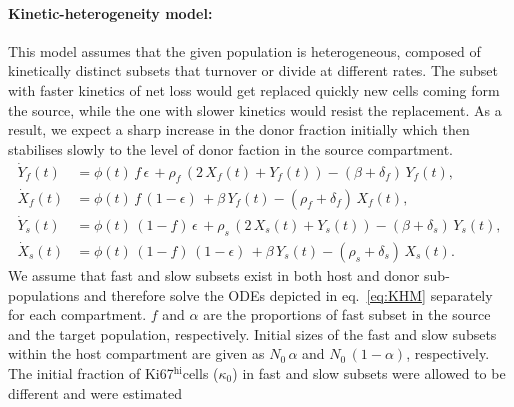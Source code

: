 \documentclass[11pt]{article}
\newcommand{\be}{\begin{equation}}
\newcommand{\ee}{\end{equation}}
\newcommand{\khi}{Ki67$^\text{hi}$}
\begin{document}
\paragraph{Kinetic-heterogeneity model:}
This model assumes that the given population is heterogeneous, composed of kinetically distinct subsets that turnover or divide at different rates. 
The subset with faster kinetics of net loss  would get replaced quickly new cells coming form the source, while the one with slower kinetics would resist the replacement.
As a result, we expect a sharp increase in the donor fraction initially which then stabilises slowly to the level of donor faction in the source compartment.
\be
\begin{aligned}
\dot Y_f(t) &= \phi(t) \, f \, \epsilon \, + \rho_f \,(2 \, X_f(t) + Y_f(t)) - (\beta + \delta_f) \, Y_f(t),\\
\dot X_f(t) &= \phi(t) \, f \, (1-\epsilon) \, + \beta  \, Y_f(t) - (\rho_f + \delta_f) \, X_f(t), \\
\dot Y_s(t) &= \phi(t) \, (1-f) \, \epsilon \, + \rho_s \,(2 \, X_s(t) + Y_s(t)) - (\beta + \delta_s) \, Y_s(t),\\
\dot X_s(t) &= \phi(t) \, (1-f) \, (1-\epsilon) \, + \beta  \, Y_s(t) - (\rho_s + \delta_s) \, X_s(t).
\end{aligned}
\label{eq:KHM}
\ee
We assume that fast and slow subsets exist in both host and donor sub-populations and therefore solve the ODEs depicted in eq.~\ref{eq:KHM} separately for each compartment.
$f$ and $\alpha$ are the proportions of fast subset in the source and the target population, respectively. 
Initial sizes of the fast and slow subsets within the host compartment are given as $N_0 \, \alpha$ and $N_0 \, (1 -\alpha)$, respectively.
The initial fraction of \khi cells ($\kappa_0$) in fast and slow subsets were allowed to be different and were estimated
\end{document}
